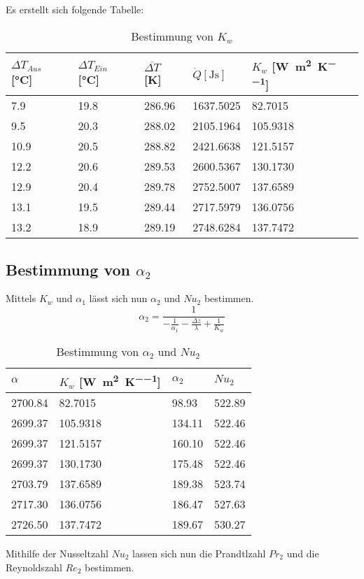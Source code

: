 \documentclass{article}
\begin{document}
 Es erstellt sich folgende Tabelle:
 \begin{table}[ht!]
  \centering
 \begin{tabularx}{\textwidth}{XXXXX}
 $\Delta T _{Aus}$ [\si{\celsius}] &  $ \Delta T _{Ein}$ [\si{\celsius}] & $\overline{\Delta T}$ [\si{\kelvin}]
 & $\dot Q [\si{\joule\second}] $ & $ K _w$ [\si{\watt\per\square\meter\per\kelvin}] \\
\hline
\rowcolor{LightCyan}
 7.9  & 19.8 & 286.96 & 1637.5025 & 82.7015  \\
 9.5  & 20.3 & 288.02 & 2105.1964 & 105.9318 \\
 \rowcolor{LightCyan}
 10.9 & 20.5 & 288.82 & 2421.6638 & 121.5157 \\
 12.2 & 20.6 & 289.53 & 2600.5367 & 130.1730 \\
 \rowcolor{LightCyan}
 12.9 & 20.4 & 289.78 & 2752.5007 & 137.6589 \\
 13.1 & 19.5 & 289.44 & 2717.5979 & 136.0756 \\
 \rowcolor{LightCyan}
 13.2 & 18.9 & 289.19 & 2748.6284 & 137.7472 \\
\end{tabularx}
  \caption{Bestimmung von $K _w$}
\end{table}

\subsection{Bestimmung von $\alpha _2$}
Mittels $K _w$ und $\alpha _1$ lässt sich nun $\alpha _2$ und $Nu_2$ bestimmen.
\begin{equation}
  \alpha _2 = \frac{1}{-\frac{1}{\alpha _1} - \frac{\Delta z}{\lambda} + \frac{1}{K _w}}
\end{equation}

 \begin{table}[ht!]
  \centering
 \begin{tabularx}{\textwidth}{XXXX}
 $\alpha$ &  $K _w$ [\si{\watt\per\square\meter\per\kelvin}] & $ \alpha _2$ & $Nu _2 $  \\
\hline
\rowcolor{LightCyan}
2700.84 & 82.7015  & 98.93  & 522.89 \\
2699.37 & 105.9318 & 134.11 & 522.46 \\
2699.37 & 121.5157 & 160.10 & 522.46 \\
2699.37 & 130.1730 & 175.48 & 522.46 \\
2703.79 & 137.6589 & 189.38 & 523.74 \\
2717.30 & 136.0756 & 186.47 & 527.63 \\
2726.50 & 137.7472 & 189.67 & 530.27 \\
\end{tabularx}
  \caption{Bestimmung von $\alpha _2$ und $Nu _2$}
\end{table}
Mithilfe der Nusseltzahl $Nu_2$ lassen sich nun die Prandtlzahl $Pr _2$
und die Reynoldszahl $Re _2$ bestimmen.
\end{document}
